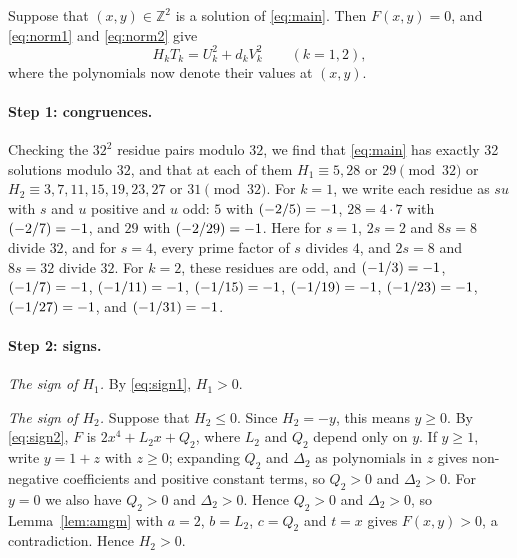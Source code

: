 \documentclass[11pt]{article}
\newcommand{\Z}{\mathbb{Z}}
\newcommand{\leg}[2]{\mathchoice{\biggl(\dfrac{#1}{#2}\biggr)}{(#1/#2)}{(#1/#2)}{(#1/#2)}}
\begin{document}
Suppose that $(x,y)\in\Z^2$ is a solution of \eqref{eq:main}. Then $F(x,y)=0$, and \eqref{eq:norm1} and \eqref{eq:norm2} give
\begin{equation}\label{eq:HT}
H_kT_k=U_k^2+d_kV_k^2\qquad(k=1,2),
\end{equation}
where the polynomials now denote their values at $(x,y)$.

\paragraph{Step 1: congruences.} Checking the $32^2$ residue pairs modulo $32$, we find that \eqref{eq:main} has exactly 32 solutions modulo $32$, and that at each of them $H_{1}\equiv5,\allowbreak 28\text{ or }29\pmod{32}$ or $H_{2}\equiv3,\allowbreak 7,\allowbreak 11,\allowbreak 15,\allowbreak 19,\allowbreak 23,\allowbreak 27\text{ or }31\pmod{32}$. For $k=1$, we write each residue as $su$ with $s$ and $u$ positive and $u$ odd: $5$ with $\leg{-2}{5}=-1$, $28=4\cdot7$ with $\leg{-2}{7}=-1$, and $29$ with $\leg{-2}{29}=-1$. Here for $s=1$, $2s=2$ and $8s=8$ divide $32$, and for $s=4$, every prime factor of $s$ divides $4$, and $2s=8$ and $8s=32$ divide $32$. For $k=2$, these residues are odd, and $\leg{-1}{3}=-1$, $\leg{-1}{7}=-1$, $\leg{-1}{11}=-1$, $\leg{-1}{15}=-1$, $\leg{-1}{19}=-1$, $\leg{-1}{23}=-1$, $\leg{-1}{27}=-1$, and $\leg{-1}{31}=-1$.

\paragraph{Step 2: signs.} \emph{The sign of $H_{1}$.} By \eqref{eq:sign1}, $H_{1}>0$.

\emph{The sign of $H_{2}$.} Suppose that $H_{2}\leq0$. Since $H_{2}=-y$, this means $y\geq0$. By \eqref{eq:sign2}, $F$ is $2x^4+L_{2}x+Q_{2}$, where $L_{2}$ and $Q_{2}$ depend only on $y$. If $y\geq1$, write $y=1+z$ with $z\geq0$; expanding $Q_{2}$ and $\Delta_{2}$ as polynomials in $z$ gives non-negative coefficients and positive constant terms, so $Q_{2}>0$ and $\Delta_{2}>0$. For $y=0$ we also have $Q_{2}>0$ and $\Delta_{2}>0$. Hence $Q_{2}>0$ and $\Delta_{2}>0$, so Lemma~\ref{lem:amgm} with $a=2$, $b=L_{2}$, $c=Q_{2}$ and $t=x$ gives $F(x,y)>0$, a contradiction. Hence $H_{2}>0$.
\end{document}
